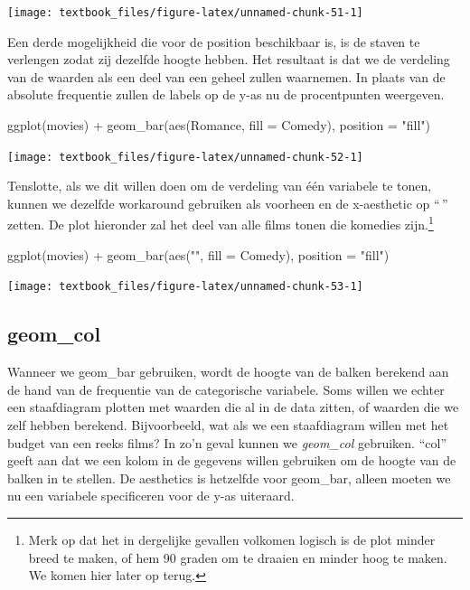 \documentclass[]{tufte-book}
\newenvironment{Shaded}{}{}
\newcommand{\AttributeTok}[1]{\textcolor[rgb]{0.49,0.56,0.16}{#1}}
\newcommand{\FunctionTok}[1]{\textcolor[rgb]{0.02,0.16,0.49}{#1}}
\newcommand{\NormalTok}[1]{#1}
\newcommand{\SpecialCharTok}[1]{\textcolor[rgb]{0.25,0.44,0.63}{#1}}
\newcommand{\StringTok}[1]{\textcolor[rgb]{0.25,0.44,0.63}{#1}}
\begin{document}
\texttt{[image: textbook\_files/figure-latex/unnamed-chunk-51-1]}

Een derde mogelijkheid die voor de position beschikbaar is, is de staven te verlengen zodat zij dezelfde hoogte hebben. Het resultaat is dat we de verdeling van de waarden als een deel van een geheel zullen waarnemen. In plaats van de absolute frequentie zullen de labels op de y-as nu de procentpunten weergeven.

\begin{Shaded}
\begin{Highlighting}[]
\FunctionTok{ggplot}\NormalTok{(movies) }\SpecialCharTok{+}
  \FunctionTok{geom\_bar}\NormalTok{(}\FunctionTok{aes}\NormalTok{(Romance, }\AttributeTok{fill =}\NormalTok{ Comedy), }\AttributeTok{position =} \StringTok{"fill"}\NormalTok{)}
\end{Highlighting}
\end{Shaded}

\texttt{[image: textbook\_files/figure-latex/unnamed-chunk-52-1]}

Tenslotte, als we dit willen doen om de verdeling van één variabele te tonen, kunnen we dezelfde workaround gebruiken als voorheen en de x-aesthetic op ``\,'' zetten. De plot hieronder zal het deel van alle films tonen die komedies zijn.\footnote{Merk op dat het in dergelijke gevallen volkomen logisch is de plot minder breed te maken, of hem 90 graden om te draaien en minder hoog te maken. We komen hier later op terug.}

\begin{Shaded}
\begin{Highlighting}[]
\FunctionTok{ggplot}\NormalTok{(movies) }\SpecialCharTok{+}
  \FunctionTok{geom\_bar}\NormalTok{(}\FunctionTok{aes}\NormalTok{(}\StringTok{""}\NormalTok{, }\AttributeTok{fill =}\NormalTok{ Comedy), }\AttributeTok{position =} \StringTok{"fill"}\NormalTok{)}
\end{Highlighting}
\end{Shaded}

\texttt{[image: textbook\_files/figure-latex/unnamed-chunk-53-1]}

\hypertarget{geom_col}{%
\subsection{geom\_col}\label{geom_col}}

Wanneer we geom\_bar gebruiken, wordt de hoogte van de balken berekend aan de hand van de frequentie van de categorische variabele. Soms willen we echter een staafdiagram plotten met waarden die al in de data zitten, of waarden die we zelf hebben berekend. Bijvoorbeeld, wat als we een staafdiagram willen met het budget van een reeks films? In zo'n geval kunnen we \emph{geom\_col} gebruiken. ``col'' geeft aan dat we een kolom in de gegevens willen gebruiken om de hoogte van de balken in te stellen. De aesthetics is hetzelfde voor geom\_bar, alleen moeten we nu een variabele specificeren voor de y-as uiteraard.
\end{document}
